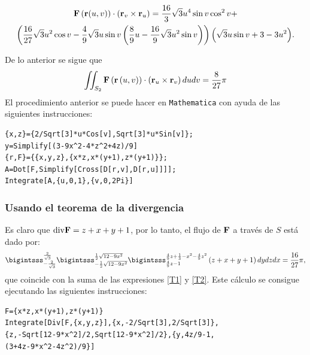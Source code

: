 {\small
\begin{multline*}
{\bf F}\left({\bf r}(u,v) \right) \cdot \left( {\bf r}_{v}\times {\bf r}_{u}\right) =
\frac{16}{3}\sqrt{3}u^{4}\sin v\cos ^{2}v+ \\
\left( \frac{16}{27}\sqrt{3}u^{2}\cos v - \frac{4}{9}\sqrt{3}u\sin v \left( \frac{8}{9}u-\frac{16}{9}\sqrt{3}u^{2}\sin v\right) \right) \left( \sqrt{3}u\sin v+3-3u^{2}\right)\!.
\end{multline*}
}

De lo anterior se sigue que
\begin{equation} \label{T2}
\iint_{S_2}{\bf F}\left( {\bf r}\left( u,v\right) \right) \cdot \left( {\bf r}_{u}\times {\bf r}_{v}\right)dudv=\frac{8}{27}\pi
\end{equation}
El procedimiento anterior se puede hacer en \verb"Mathematica" con ayuda de las siguientes instrucciones:

\begin{tcolorbox}[title=\bf Instrucción \verb"Mathematica"]\begin{Verbatim}[formatcom=\letraverbatim]
{x,z}={2/Sqrt[3]*u*Cos[v],Sqrt[3]*u*Sin[v]};
y=Simplify[(3-9x^2-4*z^2+4z)/9]
{r,F}={{x,y,z},{x*z,x*(y+1),z*(y+1)}};
A=Dot[F,Simplify[Cross[D[r,v],D[r,u]]]];
Integrate[A,{u,0,1},{v,0,2Pi}]
\end{Verbatim}
\end{tcolorbox}

\subsubsection{Usando el teorema de la divergencia}

Es claro que ${\rm div}{\bf F}=z+x+y+1$, por lo tanto, el flujo de ${\bf F}$ a través de $S$ está dado por:
\[\bigintsss_{-\frac{2}{\sqrt{3}}}^{\frac{2}{\sqrt{3}}}\bigintsss_{-\frac{1}{2}\sqrt{12-9x^{2}}}^{\frac{1}{2}\sqrt{12-9x^{2}}}\bigintsss_{\frac{4}{9}z-1}^{\frac{4}{9}z+ \frac{1}{3}-x^{2}-\frac{4}{9}z^{2}}\left( z+x+y+1\right) dydzdx=\frac{16}{27}\pi,\]
que coincide con la suma de las expresiones \ref{T1} y \ref{T2}.
Este cálculo se consigue ejecutando las siguientes instrucciones:

\begin{tcolorbox}[title=\bf Instrucción \verb"Mathematica"]\begin{Verbatim}[formatcom=\letraverbatim]
F={x*z,x*(y+1),z*(y+1)}
Integrate[Div[F,{x,y,z}],{x,-2/Sqrt[3],2/Sqrt[3]},
{z,-Sqrt[12-9*x^2]/2,Sqrt[12-9*x^2]/2},{y,4z/9-1,
(3+4z-9*x^2-4z^2)/9}]
\end{Verbatim}
\end{tcolorbox}

